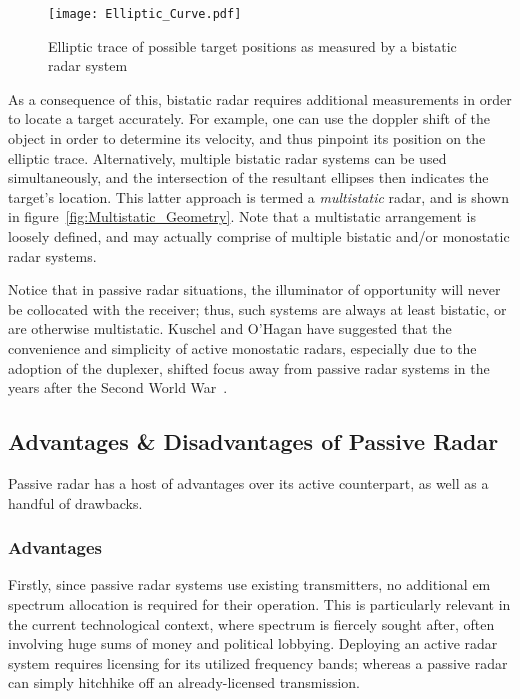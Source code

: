 \documentclass[class=report,11pt,crop=false]{standalone}
\begin{document}
\begin{figure}
    \centering
    \texttt{[image: Elliptic\_Curve.pdf]}
    \caption{Elliptic trace of possible target positions as measured by a bistatic radar system}
    \label{fig:Elliptic_Curve}
\end{figure}

As a consequence of this, bistatic radar requires additional measurements in order to locate a target accurately. For example, one can use the doppler shift of the object in order to determine its velocity, and thus pinpoint its position on the elliptic trace. Alternatively, multiple bistatic radar systems can be used simultaneously, and the intersection of the resultant ellipses then indicates the target's location. This latter approach is termed a \emph{multistatic} radar, and is shown in figure~\ref{fig:Multistatic_Geometry}. Note that a multistatic arrangement is loosely defined, and may actually comprise of multiple bistatic and/or monostatic radar systems.

Notice that in passive radar situations, the illuminator of opportunity will never be collocated with the receiver; thus, such systems are always at least bistatic, or are otherwise multistatic. Kuschel and O'Hagan have suggested that the convenience and simplicity of active monostatic radars, especially due to the adoption of the duplexer, shifted focus away from passive radar systems in the years after the Second World War~\cite{kuschel-hagan-history}.

\subsection{Advantages \& Disadvantages of Passive Radar}
Passive radar has a host of advantages over its active counterpart, as well as a handful of drawbacks.

\subsubsection{Advantages}
Firstly, since passive radar systems use existing transmitters, no additional \gls{em} spectrum allocation is required for their operation. This is particularly relevant in the current technological context, where spectrum is fiercely sought after, often involving huge sums of money and political lobbying. Deploying an active radar system requires licensing for its utilized frequency bands; whereas a passive radar can simply hitchhike off an already-licensed transmission.
\end{document}
